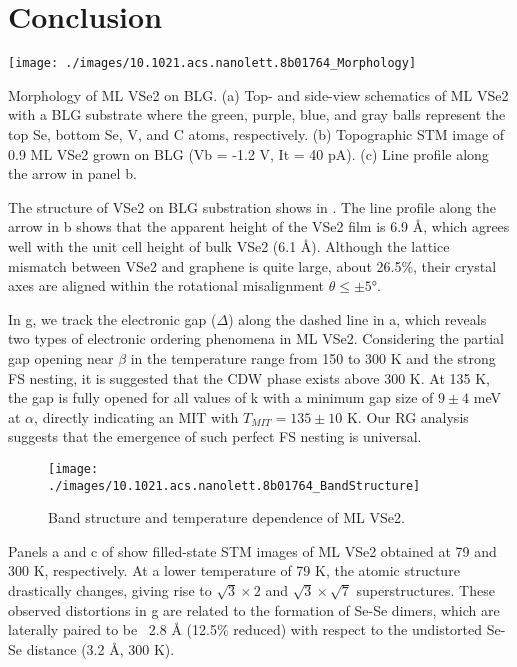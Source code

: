 \section{Conclusion}

\begin{marginfigure}
    \texttt{[image: ./images/10.1021.acs.nanolett.8b01764\_Morphology]}
	\caption[Morphology of ML VSe2 on BLG]{
        Morphology of ML VSe2 on BLG. (a) Top- and side-view schematics of ML VSe2 with a BLG substrate where the green, purple, blue, and gray balls represent the top Se, bottom Se, V, and C atoms, respectively. (b) Topographic STM image of 0.9 ML VSe2 grown on BLG (Vb = -1.2 V, It = 40 pA). (c) Line profile along the arrow in panel b.
	}
\end{marginfigure}

The structure of VSe2 on BLG substration shows in . The line profile along the arrow in b shows that the apparent height of the VSe2 film is 6.9 Å, which agrees well with the unit cell height of bulk VSe2 (6.1 Å). Although the lattice mismatch between VSe2 and graphene is quite large, about 26.5\%, their crystal axes are aligned within the rotational misalignment $\theta \le \pm 5$°.

In g, we track the electronic gap ($\Delta$) along the dashed line in a, which reveals two types of electronic ordering phenomena in ML VSe2. Considering the partial gap opening near $\beta$ in the temperature range from 150 to 300 K and the strong FS nesting, it is suggested that the CDW phase exists above 300 K. At 135 K, the gap is fully opened for all values of k with a minimum gap size of $9 \pm 4$ meV at $\alpha$, directly indicating an MIT with $T_{MIT} = 135 \pm 10$ K. Our RG analysis suggests that the emergence of such perfect FS nesting is universal.

\begin{figure}[ht] 
    \texttt{[image: ./images/10.1021.acs.nanolett.8b01764\_BandStructure]}
	\caption[Band structure and temperature dependence of ML VSe2]{
		Band structure and temperature dependence of ML VSe2.
	}
\end{figure}

Panels a and c of  show filled-state STM images of ML VSe2 obtained at 79 and 300 K, respectively. At a lower temperature of 79 K, the atomic structure drastically changes, giving rise to $\sqrt{3} \times 2$ and $\sqrt{3} \times \sqrt{7}$ superstructures. These observed distortions in g are related to the formation of Se-Se dimers, which are laterally paired to be ~2.8 Å (12.5\% reduced) with respect to the undistorted Se-Se distance (3.2 Å, 300 K).

